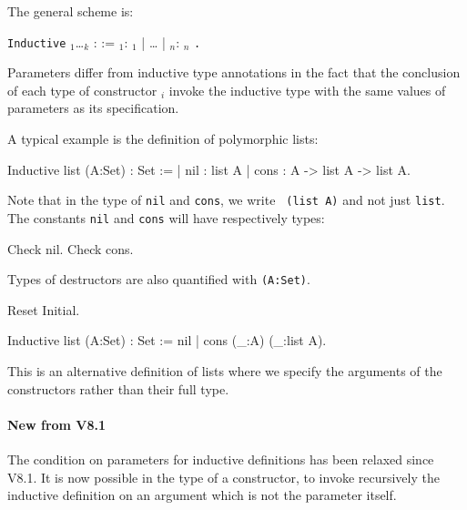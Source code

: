 The general scheme is:
\begin{center}
{\tt Inductive} {\ident} {\binder$_1$}\ldots{\binder$_k$} : {\term} :=
    {\ident$_1$}: {\term$_1$} | {\ldots} | {\ident$_n$}: \term$_n$
{\tt .}
\end{center}
Parameters differ from inductive type annotations in the fact that the
conclusion of each type of constructor {\term$_i$} invoke the inductive
type with the same values of parameters as its specification.



A typical example is the definition of polymorphic lists:
\begin{coq_example*}
Inductive list (A:Set) : Set :=
  | nil : list A
  | cons : A -> list A -> list A.
\end{coq_example*}

Note that in the type of {\tt nil} and {\tt cons}, we write {\tt
  (list A)} and not just {\tt list}.\\ The constants {\tt nil} and
{\tt cons} will have respectively types:

\begin{coq_example}
Check nil.
Check cons.
\end{coq_example}

Types of destructors are also quantified with {\tt (A:Set)}.

\begin{coq_eval}
Reset Initial.
\end{coq_eval}
\begin{Variants}
\item
\begin{coq_example*}
Inductive list (A:Set) : Set := nil | cons (_:A) (_:list A).
\end{coq_example*}
This is an alternative definition of lists where we specify the
arguments of the constructors rather than their full type.
\end{Variants}

\begin{ErrMsgs}
\item {}
\end{ErrMsgs}

\paragraph{New from \Coq{} V8.1} The condition on parameters for
inductive definitions has been relaxed since \Coq{} V8.1. It is now
possible in the type of a constructor, to invoke recursively the
inductive definition on an argument which is not the parameter itself.

